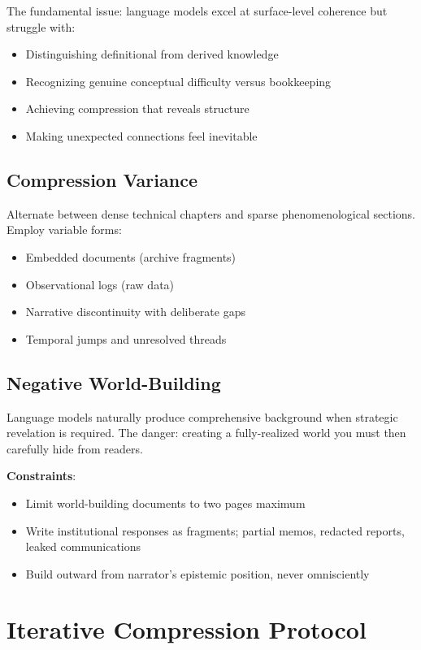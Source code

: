 The fundamental issue: language models excel at surface-level coherence but struggle with:

\begin{itemize}
\item Distinguishing definitional from derived knowledge
\item Recognizing genuine conceptual difficulty versus bookkeeping
\item Achieving compression that reveals structure
\item Making unexpected connections feel inevitable
\end{itemize}

\subsection*{Compression Variance}

Alternate between dense technical chapters and sparse phenomenological sections. Employ variable forms:

\begin{itemize}
\item Embedded documents (archive fragments)
\item Observational logs (raw data)
\item Narrative discontinuity with deliberate gaps
\item Temporal jumps and unresolved threads
\end{itemize}

\subsection*{Negative World-Building}

Language models naturally produce comprehensive background when strategic revelation is required. The danger: creating a fully-realized world you must then carefully hide from readers.

\textbf{Constraints}:

\begin{itemize}
\item Limit world-building documents to two pages maximum
\item Write institutional responses as fragments; partial memos, redacted reports, leaked communications
\item Build outward from narrator's epistemic position, never omnisciently
\end{itemize}

\section*{Iterative Compression Protocol}

